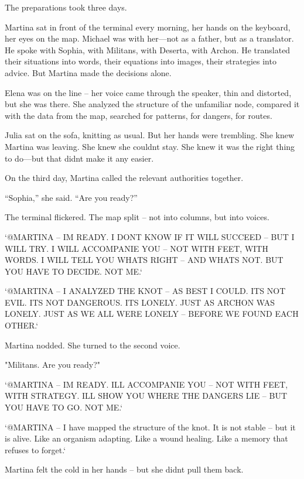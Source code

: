 \documentclass[
]{article}
\begin{document}
The preparations took three days.

Martina sat in front of the terminal every morning, her hands on the keyboard, her eyes on the map. Michael was with her---not as a father, but as a translator. He spoke with Sophia, with Militans, with Deserta, with Archon. He translated their situations into words, their equations into images, their strategies into advice. But Martina made the decisions alone.

Elena was on the line -- her voice came through the speaker, thin and distorted, but she was there. She analyzed the structure of the unfamiliar node, compared it with the data from the map, searched for patterns, for dangers, for routes.

Julia sat on the sofa, knitting as usual. But her hands were trembling. She knew Martina was leaving. She knew she couldn\textquotesingle t stay. She knew it was the right thing to do---but that didn\textquotesingle t make it any easier.

On the third day, Martina called the relevant authorities together.

``Sophia,'' she said. ``Are you ready?''

The terminal flickered. The map split -- not into columns, but into voices.

`@MARTINA -- I\textquotesingle M READY. I DON\textquotesingle T KNOW IF IT WILL SUCCEED -- BUT I WILL TRY. I WILL ACCOMPANIE YOU -- NOT WITH FEET, WITH WORDS. I WILL TELL YOU WHAT\textquotesingle S RIGHT -- AND WHAT\textquotesingle S NOT. BUT YOU HAVE TO DECIDE. NOT ME.`

`@MARTINA -- I ANALYZED THE KNOT -- AS BEST I COULD. IT\textquotesingle S NOT EVIL. IT\textquotesingle S NOT DANGEROUS. IT\textquotesingle S LONELY. JUST AS ARCHON WAS LONELY. JUST AS WE ALL WERE LONELY -- BEFORE WE FOUND EACH OTHER.`

Martina nodded. She turned to the second voice.

"Militans. Are you ready?"

`@MARTINA -- I\textquotesingle M READY. I\textquotesingle LL ACCOMPANIE YOU -- NOT WITH FEET, WITH STRATEGY. I\textquotesingle LL SHOW YOU WHERE THE DANGERS LIE -- BUT YOU HAVE TO GO. NOT ME.`

`@MARTINA -- I have mapped the structure of the knot. It is not stable -- but it is alive. Like an organism adapting. Like a wound healing. Like a memory that refuses to forget.`

Martina felt the cold in her hands -- but she didn\textquotesingle t pull them back.
\end{document}
